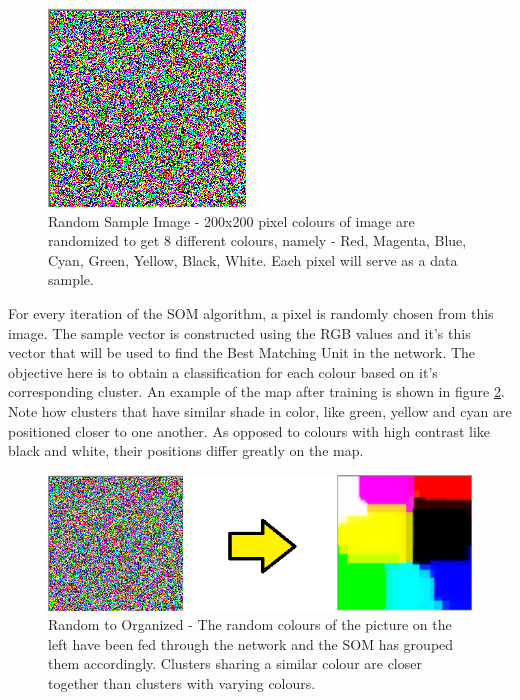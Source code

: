 \documentclass{IEEEtran}
\begin{document}
\begin{figure}[!htbp]
\centering
\includegraphics[scale=0.40]{./images/randomsample.png}
	\caption{Random Sample Image - 200x200 pixel colours of image are randomized to get 8 different colours, namely - Red, Magenta, Blue, Cyan, Green, Yellow, Black, White. Each pixel will serve as a data sample.}
\label{fig:randsample} 
\end{figure}

For every iteration of the SOM algorithm, a pixel is randomly chosen from this image. The sample vector is constructed using the RGB values and it's this vector that will be used to find the Best Matching Unit in the network. The objective here is to obtain a classification for each colour based on it's corresponding cluster. An example of the map after training is shown in figure \ref{fig:orgnaizedcolors}. Note how clusters that have similar shade in color, like green, yellow and cyan are positioned closer to one another. As opposed to colours with high contrast like black and white, their positions differ greatly on the map.

\begin{figure}[!htbp]
\centering
\includegraphics[scale=0.50]{./images/random_to_organization.png}
	\caption{Random to Organized - The random colours of the picture on the left have been fed through the network and the SOM has grouped them accordingly. Clusters sharing a similar colour are closer together than clusters with varying colours.}
\label{fig:orgnaizedcolors} 
\end{figure}
\end{document}
